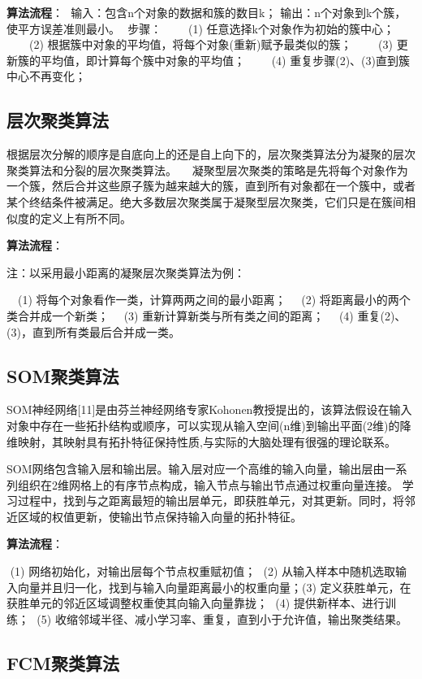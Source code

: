 \textbf{算法流程}： ​ 输入：包含n个对象的数据和簇的数目k； ​
输出：n个对象到k个簇，使平方误差准则最小。 ​ 步骤： 　　(1)
任意选择k个对象作为初始的簇中心； 　　(2)
根据簇中对象的平均值，将每个对象(重新)赋予最类似的簇； 　　(3)
更新簇的平均值，即计算每个簇中对象的平均值； 　　(4)
重复步骤(2)、(3)直到簇中心不再变化；

\subsection{层次聚类算法}\label{ux5c42ux6b21ux805aux7c7bux7b97ux6cd5}

​
根据层次分解的顺序是自底向上的还是自上向下的，层次聚类算法分为凝聚的层次聚类算法和分裂的层次聚类算法。
　凝聚型层次聚类的策略是先将每个对象作为一个簇，然后合并这些原子簇为越来越大的簇，直到所有对象都在一个簇中，或者某个终结条件被满足。绝大多数层次聚类属于凝聚型层次聚类，它们只是在簇间相似度的定义上有所不同。

\textbf{算法流程}：

注：以采用最小距离的凝聚层次聚类算法为例：

　(1) 将每个对象看作一类，计算两两之间的最小距离； 　(2)
将距离最小的两个类合并成一个新类； 　(3)
重新计算新类与所有类之间的距离； 　(4)
重复(2)、(3)，直到所有类最后合并成一类。

\subsection{SOM聚类算法}\label{somux805aux7c7bux7b97ux6cd5}

​
SOM神经网络{[}11{]}是由芬兰神经网络专家Kohonen教授提出的，该算法假设在输入对象中存在一些拓扑结构或顺序，可以实现从输入空间(n维)到输出平面(2维)的降维映射，其映射具有拓扑特征保持性质,与实际的大脑处理有很强的理论联系。

​
SOM网络包含输入层和输出层。输入层对应一个高维的输入向量，输出层由一系列组织在2维网格上的有序节点构成，输入节点与输出节点通过权重向量连接。
学习过程中，找到与之距离最短的输出层单元，即获胜单元，对其更新。同时，将邻近区域的权值更新，使输出节点保持输入向量的拓扑特征。

\textbf{算法流程}：

​ (1) 网络初始化，对输出层每个节点权重赋初值； ​ (2)
从输入样本中随机选取输入向量并且归一化，找到与输入向量距离最小的权重向量；
​ (3) 定义获胜单元，在获胜单元的邻近区域调整权重使其向输入向量靠拢； ​
(4) 提供新样本、进行训练； ​ (5)
收缩邻域半径、减小学习率、重复，直到小于允许值，输出聚类结果。

\subsection{ FCM聚类算法}\label{fcmux805aux7c7bux7b97ux6cd5}

